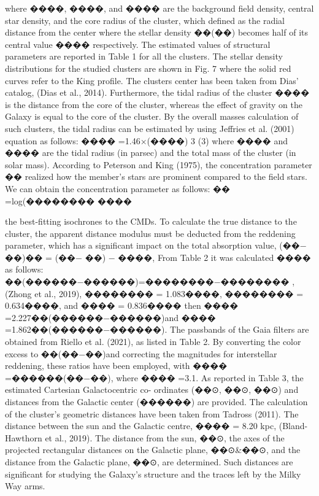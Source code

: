 \documentclass[../Main.tex]{subfiles}
\begin{document}
{where ����, ����, and ���� are the background field density, central star
density, and the core radius of the cluster, which defined as the radial
distance from the center where the stellar density ��(��) becomes half
of its central value ���� respectively. The estimated values of structural
parameters are reported in Table 1 for all the clusters. The stellar
density distributions for the studied clusters are shown in Fig. 7 where
the solid red curves refer to the King profile. The clusters center has
been taken from Dias’ catalog, (Dias et al., 2014). Furthermore, the
tidal radius of the cluster ���� is the distance from the core of the cluster,
whereas the effect of gravity on the Galaxy is equal to the core of the
cluster. By the overall masses calculation of such clusters, the tidal
radius can be estimated by using Jeffries et al. (2001) equation as
follows:
���� =1.46×(����)
3 (3)
where ���� and ���� are the tidal radius (in parsec) and the total mass
of the cluster (in solar mass). According to Peterson and King (1975),
the concentration parameter �� realized how the member’s stars are
prominent compared to the field stars. We can obtain the concentration
parameter as follows:
�� =log(��������
���� 

the best-fitting isochrones to the CMDs. To calculate the true distance
to the cluster, the apparent distance modulus must be deducted from
the reddening parameter, which has a significant impact on the total
absorption value, (��− ��)�� = (��− ��) − ����, From Table 2 it was
calculated ���� as follows: ��(������−������)=��������−�������� , (Zhong et al.,
2019), ��������
= 1.083����, ��������
= 0.634����, and ���� = 0.836���� then
���� =2.227��(������−������)and ���� =1.862��(������−������). The passbands
of the Gaia filters are obtained from Riello et al. (2021), as listed in
Table 2. By converting the color excess to ��(��−��)and correcting the
magnitudes for interstellar reddening, these ratios have been employed,
with ���� =������(��−��), where ���� =3.1.
As reported in Table 3, the estimated Cartesian Galactocentric co-
ordinates (��⊙, ��⊙, ��⊙) and distances from the Galactic center (������)
are provided. The calculation of the cluster’s geometric distances have
been taken from Tadross (2011). The distance between the sun and
the Galactic centre, ���� = 8.20 kpc, (Bland-Hawthorn et al., 2019).
The distance from the sun, ��⊙, the axes of the projected rectangular
distances on the Galactic plane, ��⊙&��⊙, and the distance from the
Galactic plane, ��⊙, are determined. Such distances are significant for
studying the Galaxy’s structure and the traces left by the Milky Way
arms.

}
\end{document}
